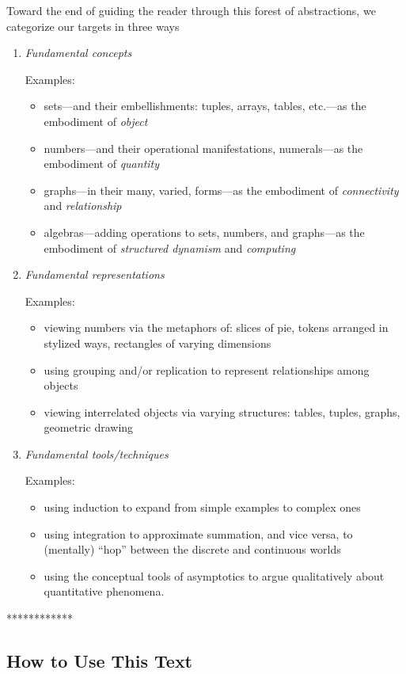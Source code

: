 Toward the end of guiding the reader through this forest of
abstractions, we categorize our targets in three ways
\begin{enumerate}
\item
{\it Fundamental concepts}

{\sf Examples:}
\begin{itemize}
\item
sets---and their embellishments: tuples, arrays, tables, etc.---as the
embodiment of {\it object}
\item
numbers---and their operational manifestations, numerals---as the
embodiment of {\it quantity}
\item
graphs---in their many, varied, forms---as the embodiment of {\it
  connectivity} and {\it relationship}
\item
algebras---adding operations to sets, numbers, and graphs---as the
embodiment of {\it structured dynamism} and {\it computing}
\end{itemize}

\item
{\it Fundamental representations}

{\sf Examples:}
\begin{itemize}
\item
viewing numbers via the metaphors of: slices of pie, tokens arranged in
stylized ways, rectangles of varying dimensions
\item
using grouping and/or replication to represent relationships among
objects
\item
viewing interrelated objects via varying structures: tables, tuples,
graphs, geometric drawing
\end{itemize}

\item
{\it Fundamental tools/techniques}

{\sf Examples:}
\begin{itemize}
\item
using induction to expand from simple examples to complex ones
\item
using integration to approximate summation, and vice versa, to
(mentally) ``hop'' between the discrete and continuous worlds
\item
using the conceptual tools of asymptotics to argue qualitatively about
quantitative phenomena.
\end{itemize}
\end{enumerate}

************

\subsection{How to Use This Text}
\label{sec:how-to-use}


